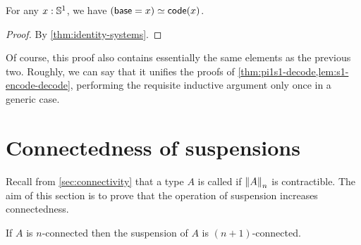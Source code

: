 \begin{cor}
  For any $x:\Sn^1$, we have $\eqv{(\base=x)}{\code(x)}$.
\end{cor}
\begin{proof}
  By \autoref{thm:identity-systems}.
\end{proof}

Of course, this proof also contains essentially the same elements as the previous two.
Roughly, we can say that it unifies the proofs of \autoref{thm:pi1s1-decode,lem:s1-encode-decode}, performing the requisite inductive argument only once in a generic case.


\section{Connectedness of suspensions}
\label{sec:conn-susp}

Recall from \autoref{sec:connectivity} that a type $A$ is called  if $\trunc nA$ is contractible.
The aim of this section is to prove that the operation of suspension increases connectedness.

\begin{thm} \label{thm:suspension-increases-connectedness}
  If $A$ is $n$-connected then the suspension of $A$ is $(n+1)$-connected.
\end{thm}

